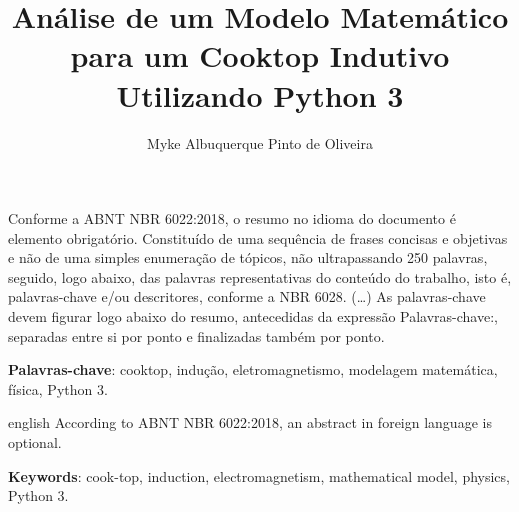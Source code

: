 \documentclass[
	article,			%
	11pt,				%
	oneside,			%
	a4paper,			%
	english,			%
	brazil,				%
	sumario=tradicional
	]{abntex2}
\title{\Huge{Análise de um Modelo Matemático para um Cooktop Indutivo Utilizando Python 3}}
\author{Myke Albuquerque Pinto de Oliveira}
\begin{document}

\frenchspacing 


%
%

\maketitle





\begin{resumoumacoluna}
 Conforme a ABNT NBR 6022:2018, o resumo no idioma do documento é elemento obrigatório. 
 Constituído de uma sequência de frases concisas e objetivas e não de uma 
 simples enumeração de tópicos, não ultrapassando 250 palavras, seguido, logo 
 abaixo, das palavras representativas do conteúdo do trabalho, isto é, 
 palavras-chave e/ou descritores, conforme a NBR 6028. (\ldots) As 
 palavras-chave devem figurar logo abaixo do resumo, antecedidas da expressão 
 Palavras-chave:, separadas entre si por ponto e finalizadas também por ponto.
 
 \vspace{\onelineskip}
 
 \noindent
 \textbf{Palavras-chave}: cooktop, indução, eletromagnetismo, modelagem matemática, física, Python 3.
\end{resumoumacoluna}


\renewcommand{\resumoname}{Abstract}
\begin{resumoumacoluna}
 \begin{otherlanguage*}{english}
   According to ABNT NBR 6022:2018, an abstract in foreign language is optional.

   \vspace{\onelineskip}
 
   \noindent
   \textbf{Keywords}: cook-top, induction, electromagnetism, mathematical model, physics, Python 3.
 \end{otherlanguage*}  
\end{resumoumacoluna}
\end{document}

